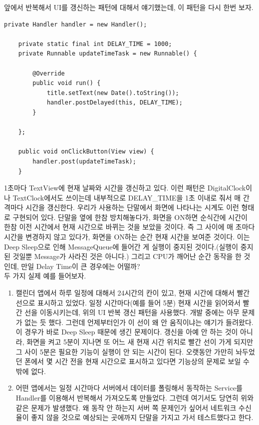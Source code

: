 앞에서 반복해서 UI를 갱신하는 패턴에 대해서 얘기했는데, 이 패턴을 다시 한번 보자.
\begin{lstlisting}[frame=single, caption=Deep Sleep 대응 필요, label=src:DefaultUpdateTime] 
  	private Handler handler = new Handler();

	private static final int DELAY_TIME = 1000;
	private Runnable updateTimeTask = new Runnable() {

		@Override
		public void run() {
			title.setText(new Date().toString());
			handler.postDelayed(this, DELAY_TIME);
		}

	};

	public void onClickButton(View view) {
		handler.post(updateTimeTask);
	}
\end{lstlisting}
1초마다 TextView에 현재 날짜와 시간을 갱신하고 있다.
이런 패턴은 DigitalClock이나 TextClock에서도 쓰이는데 내부적으로 DELAY\_TIME을 1초 이내로 줘서 매 간격마다 시간을 갱신한다. 
우리가 사용하는 단말에서 화면에 나타나는 시계도 이런 형태로 구현되어 있다.
단말을 옆에 한참 방치해놓다가, 화면을 ON하면 순식간에 시간이 한참 이전 시간에서 현재 시간으로 바뀌는 것을 보았을 것이다. 즉 그 사이에 매 초마다 시간을 변경하지 않고 있다가, 화면을 ON하는 순간 현재 시간을 보여준 것이다.
이는 Deep Sleep으로 인해 MessageQueue에 들어간 게 실행이 중지된 것이다.(실행이 중지된 것일뿐 Message가 사라진 것은 아니다.)
그리고 CPU가 깨어난 순간 동작을 한 것인데, 만일 Delay Time이 큰 경우에는 어떨까?\\

두 가지 실제 예를 들어보자.
\begin{enumerate}
\item 캘린더 앱에서 하루 일정에 대해서 24시간의 칸이 있고, 현재 시간에 대해서 빨간 선으로 표시하고 있었다. 
일정 시간마다(예를 들어 5분) 현재 시간을 읽어와서 빨간 선을 이동시키는데, 위의 UI 반복 갱신 패턴을 사용했다.
개발 중에는 아무 문제가 없는 듯 했다. 그런데 언제부터인가 이 선이 왜 안 움직이냐는 얘기가 들려왔다.
이 경우가 바로 Deep Sleep 때문에 생긴 문제이다. 
갱신을 아예 안 하는 것이 아니라, 화면을 켜고 5분이 지나면 또 어느 새 현재 시간 위치로 빨간 선이 가게 되지만 그 사이 5분은 필요한 기능이 실행이 안 되는 시간이 된다.
오랫동안 가만히 놔두었던 폰에서 몇 시간 전을 현재 시간으로 표시하고 있다면 기능상의 문제로 보일 수 밖에 없다.

\item 어떤 앱에서는 일정 시간마다 서버에서 데이터를 폴링해서 동작하는 Service를 Handler를 이용해서 반복해서 가져오도록 만들었다. 그런데 여기서도 당연히 위와 같은 문제가 발생했다. 왜 동작 안 하는지 서버 쪽 문제인가 싶어서 네트워크 수신율이 좋지 않을 것으로 예상되는 곳에까지 단말을 가지고 가서 테스트했다고 한다.
\end{enumerate}

